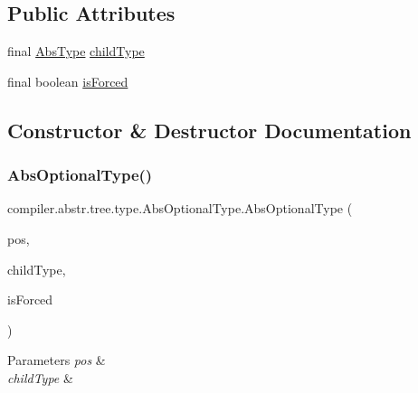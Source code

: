 \subsection*{Public Attributes}
\begin{DoxyCompactItemize}
\item 
final \hyperlink{classcompiler_1_1abstr_1_1tree_1_1type_1_1_abs_type}{Abs\+Type} \hyperlink{classcompiler_1_1abstr_1_1tree_1_1type_1_1_abs_optional_type_ad9d2dd30993f97aed9100007843ba313}{child\+Type}
\item 
final boolean \hyperlink{classcompiler_1_1abstr_1_1tree_1_1type_1_1_abs_optional_type_a4a2576a002e4fc58799ceb9a484ad654}{is\+Forced}
\end{DoxyCompactItemize}


\subsection{Constructor \& Destructor Documentation}
\mbox{\label{classcompiler_1_1abstr_1_1tree_1_1type_1_1_abs_optional_type_a735827bb81992b3c92aaa909d2d69680}} 
\subsubsection{\texorpdfstring{Abs\+Optional\+Type()}{AbsOptionalType()}}
{\footnotesize\ttfamily compiler.\+abstr.\+tree.\+type.\+Abs\+Optional\+Type.\+Abs\+Optional\+Type (\begin{DoxyParamCaption}\item[{\hyperlink{classcompiler_1_1_position}{Position}}]{pos,  }\item[{\hyperlink{classcompiler_1_1abstr_1_1tree_1_1type_1_1_abs_type}{Abs\+Type}}]{child\+Type,  }\item[{boolean}]{is\+Forced }\end{DoxyParamCaption})}


\begin{DoxyParams}{Parameters}
{\em pos} & \\
\hline
{\em child\+Type} & \\
\hline
\end{DoxyParams}


